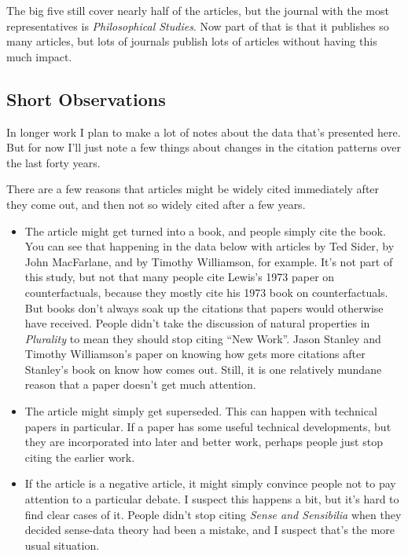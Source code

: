 \documentclass[
  10pt,
  letterpaper,
  DIV=11,
  numbers=noendperiod,
  twoside]{scrartcl}
\providecommand{\tightlist}{%
  \setlength{\itemsep}{0pt}\setlength{\parskip}{0pt}}\usepackage{longtable,booktabs,array}
\begin{document}
The big five still cover nearly half of the articles, but the journal
with the most representatives is \emph{Philosophical Studies}. Now part
of that is that it publishes so many articles, but lots of journals
publish lots of articles without having this much impact.

\subsection{Short Observations}\label{short-observations}

In longer work I plan to make a lot of notes about the data that's
presented here. But for now I'll just note a few things about changes in
the citation patterns over the last forty years.

There are a few reasons that articles might be widely cited immediately
after they come out, and then not so widely cited after a few years.

\begin{itemize}
\tightlist
\item
  The article might get turned into a book, and people simply cite the
  book. You can see that happening in the data below with articles by
  Ted Sider, by John MacFarlane, and by Timothy Williamson, for example.
  It's not part of this study, but not that many people cite Lewis's
  1973 paper on counterfactuals, because they mostly cite his 1973 book
  on counterfactuals. But books don't always soak up the citations that
  papers would otherwise have received. People didn't take the
  discussion of natural properties in \emph{Plurality} to mean they
  should stop citing ``New Work''. Jason Stanley and Timothy
  Williamson's paper on knowing how gets more citations after Stanley's
  book on know how comes out. Still, it is one relatively mundane reason
  that a paper doesn't get much attention.
\item
  The article might simply get superseded. This can happen with
  technical papers in particular. If a paper has some useful technical
  developments, but they are incorporated into later and better work,
  perhaps people just stop citing the earlier work.
\item
  If the article is a negative article, it might simply convince people
  not to pay attention to a particular debate. I suspect this happens a
  bit, but it's hard to find clear cases of it. People didn't stop
  citing \emph{Sense and Sensibilia} when they decided sense-data theory
  had been a mistake, and I suspect that's the more usual situation.
\end{itemize}
\end{document}
